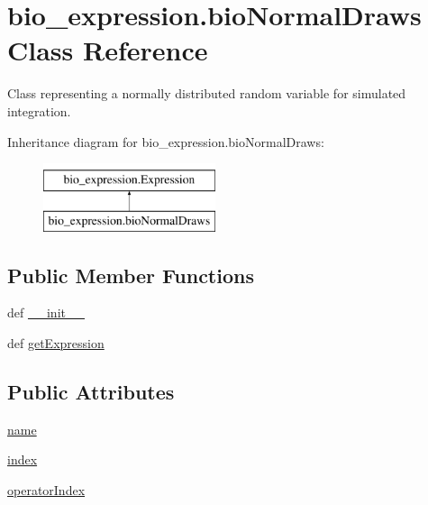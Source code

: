 \hypertarget{classbio__expression_1_1bio_normal_draws}{\section{bio\+\_\+expression.\+bio\+Normal\+Draws Class Reference}
\label{classbio__expression_1_1bio_normal_draws}
}


Class representing a normally distributed random variable for simulated integration.  


Inheritance diagram for bio\+\_\+expression.\+bio\+Normal\+Draws\+:\begin{figure}[H]
\begin{center}
\leavevmode
\includegraphics[height=2.000000cm]{da/dbb/classbio__expression_1_1bio_normal_draws}
\end{center}
\end{figure}
\subsection*{Public Member Functions}
\begin{DoxyCompactItemize}
\item 
def \hyperlink{classbio__expression_1_1bio_normal_draws_ac79c7efc6b14790ff14cb7d1019bbcf5}{\+\_\+\+\_\+init\+\_\+\+\_\+}
\item 
def \hyperlink{classbio__expression_1_1bio_normal_draws_af80629e4f2b5157907ee0fd4a772dc80}{get\+Expression}
\end{DoxyCompactItemize}
\subsection*{Public Attributes}
\begin{DoxyCompactItemize}
\item 
\hyperlink{classbio__expression_1_1bio_normal_draws_a19eeeea8d6a800cfb132da8ee32407c8}{name}
\item 
\hyperlink{classbio__expression_1_1bio_normal_draws_a5e8ba3573b5e4c8944d22d55fc1a2962}{index}
\item 
\hyperlink{classbio__expression_1_1bio_normal_draws_a792d7baa7f509b11688b54a15b9f9ed0}{operator\+Index}
\end{DoxyCompactItemize}


